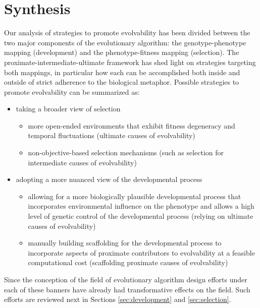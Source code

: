 \section{Synthesis} \label{sec:synthesis}
Our analysis of strategies to promote evolvability has been divided between the two major components of the evolutionary algorithm: the genotype-phenotype mapping (development) and the phenotype-fitness mapping (selection). The proximate-intermediate-ultimate framework has shed light on strategies targeting both mappings, in particular how each can be accomplished both inside and outside of strict adherence to the biological metaphor. Possible strategies to promote evolvability can be summarized as:
\begin{itemize}
\item taking a broader view of selection
\begin{itemize}
\item more open-ended environments that exhibit fitness degeneracy and temporal fluctuations (ultimate causes of evolvability)
\item non-objective-based selection mechanisms (such as selection for intermediate causes of evolvability)
\end{itemize}
\item adopting a more nuanced view of the developmental process
\begin{itemize}
\item allowing for a more biologically plausible developmental process that incorporates environmental influence on the phenotype and allows a high level of genetic control of the developmental process (relying on ultimate causes of evolvability)
\item manually building scaffolding for the developmental process to incorporate aspects of proximate contributors to evolvability at a feasible computational cost (scaffolding proximate causes of evolvability)
\end{itemize}
\end{itemize}
Since the conception of the field of evolutionary algorithm design efforts under each of these banners have already had transformative effects on the field. Such efforts are reviewed next in Sections \ref{sec:development} and \ref{sec:selection}.

